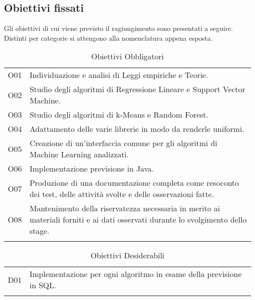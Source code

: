 \subsection{Obiettivi fissati}
Gli obiettivi di cui viene previsto il ragiungimento sono presentati a seguire. Distinti per categorie si attengono alla nomenclatura appena esposta.
{\renewcommand{\arraystretch}{2}
\begin{longtable}{|p{1cm}| p{12.25cm}|}
	\hline
	\rowcolor{blue} \multicolumn{2}{|c|}{
	\textbf{\textcolor{white}{Obbligatori}}
	} \\
		\endhead
		\hline \rowcolor{lightbrown}
		O01 & 
		Individuazione e analisi di Leggi empiriche  e Teorie. \\	
		\hline \rowcolor{lighterbrown}
		O02 & 
		Studio degli algoritmi di Regressione Lineare e Support Vector Machine. \\	
		\hline \rowcolor{lightbrown}
		O03 & 
		Studio degli algoritmi di k-Means e Random Forest.\\	
	\hline \rowcolor{lighterbrown}
		O04 & 
		Adattamento delle varie librerie in modo da renderle uniformi.\\	
	\hline \rowcolor{lightbrown}
		O05 & 
		Creazione di un'interfaccia comune per gli algoritmi di Machine Learning analizzati.\\	
	\hline \rowcolor{lighterbrown}
		O06 & 
		Implementazione previsione in Java.\\	
	\hline \rowcolor{lightbrown}
		O07 & 
		Produzione di una documentazione completa come resoconto dei test, delle attività svolte e delle osservazioni fatte.\\	
	\hline \rowcolor{lighterbrown}
		O08 & 
		Mantenimento della riservatezza necessaria in merito ai materiali forniti e ai dati osservati durante lo svolgimento dello stage.\\	
	\hline
	\caption{Obiettivi Obbligatori}\label{tab:obb-ob}
\end{longtable}}

{\renewcommand{\arraystretch}{2}
\begin{longtable}{|p{1cm}| p{12.25cm} |}
	\hline
	\rowcolor{blue} \multicolumn{2}{|c|}{
	{\textcolor{white}{Desiderabili}}
	} \\
		\endhead
		\hline \rowcolor{lightbrown}
		D01 & 
		Implementazione per ogni algoritmo in esame della previsione in SQL.\\	
	\hline
	\caption{Obiettivi Desiderabili}\label{tab:des-ob}
\end{longtable}}

